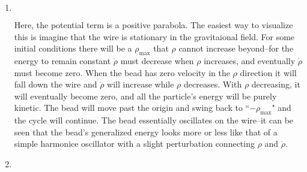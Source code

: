 \documentclass[12pt,a4]{article}
\begin{document}
\begin{enumerate}
\begin{enumerate}
        \begin{enumerate}
          \item
            $\quad$\\
            \begin{center}
            \end{center}
              Here, the potential term is a positive parabola.
              The easiest way to visualize this is imagine that the wire is stationary in the gravitaional field.
              For some initial conditions there will be a $\rho_{\text{max}}$ that $\rho$ cannot increase beyond--for the energy to remain constant $\dot \rho$ must decrease when $\rho$ increases, and eventually $\dot \rho$ must become zero.
              When the bead has zero velocity in the $\rho$ direction it will fall down the wire and $\dot \rho$ will increase while $\rho$ decreases.
              With $\rho$ decreasing, it will eventually become zero, and all the particle's energy will be purely kinetic.
              The bead will move past the origin and swing back to ``$-\rho_{\text{max}}$" and the cycle will continue.
              The bead essentially oscillates on the wire--it can be seen that the bead's generalized energy looks more or less like that of a simple harmonice oscillator with a slight perturbation connecting $\rho$ and $\dot \rho$.

          \item
            $\quad$\\
            \begin{center}
            \end{center}


\end{enumerate}
\end{enumerate}
\end{enumerate}
\end{document}
